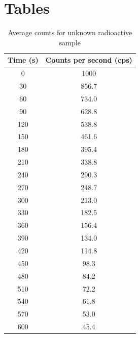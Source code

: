\documentclass[11pt,a4paper]{article}
\makeatletter
\renewcommand\listoftables{%
    \@starttoc{lot}%
}
\makeatother
\begin{document}
\section*{Tables}

{%
\let\oldnumberline\numberline%
\renewcommand{\numberline}{\tablename~\oldnumberline}%
\listoftables%
}


\newpage


\begin{longtable}{|c|c|}
        \caption{Average counts for unknown radioactive sample}
        \label{tab-half-life}
        \\
        \hline
        \textbf{Time (s)}& 
        \textbf{Counts per second (cps)}
        \\
        \hline
        \endfirsthead
        0
        &1000
        \\
        30
        &856.7
        \\
        60
        &734.0
        \\
        90
        &628.8
        \\
        120
        &538.8
        \\
        150
        &461.6
        \\
        180
        &395.4
        \\
        210
        &338.8
        \\
        240
        &290.3
        \\
        270
        &248.7
        \\
        300
        &213.0
        \\
        330
        &182.5
        \\
        360
        &156.4
        \\
        390
        &134.0
        \\
        420
        &114.8
        \\
        450
        &98.3
        \\
        480
        &84.2
        \\
        510
        &72.2
        \\
        540
        &61.8
        \\
        570
        &53.0
        \\
        600
        &45.4
        \\
        \hline
\end{longtable}


\newpage
\end{document}
